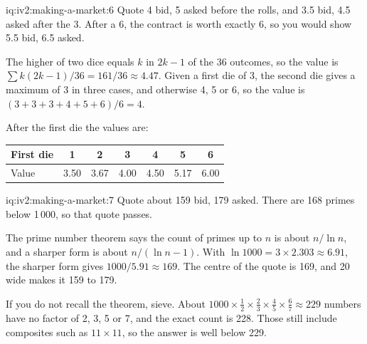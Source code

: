 \begin{solution}{iq:iv2:making-a-market:6}
Quote 4 bid, 5 asked before the rolls, and 3.5 bid, 4.5 asked after the 3. After a 6, the contract is worth exactly 6, so you would show 5.5 bid, 6.5 asked.

The higher of two dice equals $k$ in $2k - 1$ of the 36 outcomes, so the value is $\sum k(2k - 1)/36 = 161/36 \approx 4.47$. Given a first die of 3, the second die gives a maximum of 3 in three cases, and otherwise 4, 5 or 6, so the value is $(3 + 3 + 3 + 4 + 5 + 6)/6 = 4$.

After the first die the values are:
\begin{center}\small
\begin{tabular}{@{}l*{6}{c}@{}}
First die & 1 & 2 & 3 & 4 & 5 & 6 \\ \hline
Value & 3.50 & 3.67 & 4.00 & 4.50 & 5.17 & 6.00
\end{tabular}
\end{center}

\end{solution}

\begin{solution}{iq:iv2:making-a-market:7}
Quote about 159 bid, 179 asked. There are 168 primes below 1\,000, so that quote passes.

The prime number theorem says the count of primes up to $n$ is about $n/\ln n$, and a sharper form is about $n/(\ln n - 1)$. With $\ln 1000 = 3 \times 2.303 \approx 6.91$, the sharper form gives $1000/5.91 \approx 169$. The centre of the quote is 169, and 20 wide makes it 159 to 179.

If you do not recall the theorem, sieve. About $1000 \times \tfrac12 \times \tfrac23 \times \tfrac45 \times \tfrac67 \approx 229$ numbers have no factor of 2, 3, 5 or 7, and the exact count is 228. Those still include composites such as $11 \times 11$, so the answer is well below 229.

\end{solution}


